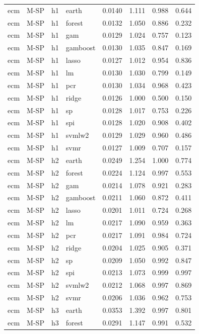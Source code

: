 \begin{ThreePartTable}
\begin{longtable}[t]{llclcccc}
\addlinespace
ecm & M-SP & h1 & earth & 0.0140 & 1.111 & 0.988 & 0.644\\
ecm & M-SP & h1 & forest & 0.0132 & 1.050 & 0.886 & 0.232\\
ecm & M-SP & h1 & gam & 0.0129 & 1.024 & 0.757 & 0.123\\
ecm & M-SP & h1 & gamboost & 0.0130 & 1.035 & 0.847 & 0.169\\
ecm & M-SP & h1 & lasso & 0.0127 & 1.012 & 0.954 & 0.836\\
ecm & M-SP & h1 & lm & 0.0130 & 1.030 & 0.799 & 0.149\\
ecm & M-SP & h1 & pcr & 0.0130 & 1.034 & 0.968 & 0.423\\
ecm & M-SP & h1 & ridge & 0.0126 & 1.000 & 0.500 & 0.150\\
ecm & M-SP & h1 & sp & 0.0128 & 1.017 & 0.753 & 0.226\\
ecm & M-SP & h1 & spi & 0.0128 & 1.020 & 0.908 & 0.402\\
ecm & M-SP & h1 & svmlw2 & 0.0129 & 1.029 & 0.960 & 0.486\\
ecm & M-SP & h1 & svmr & 0.0127 & 1.009 & 0.707 & 0.157\\
\addlinespace
ecm & M-SP & h2 & earth & 0.0249 & 1.254 & 1.000 & 0.774\\
ecm & M-SP & h2 & forest & 0.0224 & 1.124 & 0.997 & 0.553\\
ecm & M-SP & h2 & gam & 0.0214 & 1.078 & 0.921 & 0.283\\
ecm & M-SP & h2 & gamboost & 0.0211 & 1.060 & 0.872 & 0.411\\
ecm & M-SP & h2 & lasso & 0.0201 & 1.011 & 0.724 & 0.268\\
ecm & M-SP & h2 & lm & 0.0217 & 1.090 & 0.959 & 0.363\\
ecm & M-SP & h2 & pcr & 0.0217 & 1.091 & 0.984 & 0.724\\
ecm & M-SP & h2 & ridge & 0.0204 & 1.025 & 0.905 & 0.371\\
ecm & M-SP & h2 & sp & 0.0209 & 1.050 & 0.992 & 0.847\\
ecm & M-SP & h2 & spi & 0.0213 & 1.073 & 0.999 & 0.997\\
ecm & M-SP & h2 & svmlw2 & 0.0212 & 1.068 & 0.997 & 0.869\\
ecm & M-SP & h2 & svmr & 0.0206 & 1.036 & 0.962 & 0.753\\
\addlinespace
ecm & M-SP & h3 & earth & 0.0353 & 1.392 & 0.997 & 0.801\\
ecm & M-SP & h3 & forest & 0.0291 & 1.147 & 0.991 & 0.532\\

\end{longtable}
\end{ThreePartTable}
